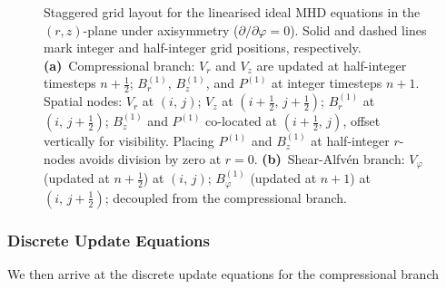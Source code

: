 \begin{figure}

\caption{%
Staggered grid layout for the linearised ideal MHD equations in the $(r,z)$-plane
under axisymmetry ($\partial/\partial\varphi = 0$).
Solid and dashed lines mark integer and half-integer grid positions, respectively.
\textbf{(a)}~Compressional branch:
\textcolor{cVr}{$V_r$} and \textcolor{cVz}{$V_z$} are updated at half-integer timesteps $n{+}\tfrac{1}{2}$;
\textcolor{cBr}{$B_r^{(1)}$}, \textcolor{cBz}{$B_z^{(1)}$}, and \textcolor{cP}{$P^{(1)}$}
at integer timesteps $n{+}1$.
Spatial nodes:
\textcolor{cVr}{$V_r$} at $(i,\,j)$;
\textcolor{cVz}{$V_z$} at $(i{+}\tfrac{1}{2},\,j{+}\tfrac{1}{2})$;
\textcolor{cBr}{$B_r^{(1)}$} at $(i,\,j{+}\tfrac{1}{2})$;
\textcolor{cBz}{$B_z^{(1)}$} and \textcolor{cP}{$P^{(1)}$}
co-located at $(i{+}\tfrac{1}{2},\,j)$, offset vertically for visibility.
Placing \textcolor{cP}{$P^{(1)}$} and \textcolor{cBz}{$B_z^{(1)}$}
at half-integer $r$-nodes avoids division by zero at $r=0$.
\textbf{(b)}~Shear-Alfv\'{e}n branch:
\textcolor{cVp}{$V_\varphi$} (updated at $n{+}\tfrac{1}{2}$) at $(i,\,j)$;
\textcolor{cBp}{$B_\varphi^{(1)}$} (updated at $n{+}1$) at $(i,\,j{+}\tfrac{1}{2})$;
decoupled from the compressional branch.}

\end{figure}





\subsubsection{Discrete Update Equations}
We then arrive at the discrete update equations for the compressional branch

